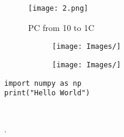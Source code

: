 \begin{figure}[!h]
    \centering
    \texttt{[image: 2.png]}
    \caption{PC from 10 to 1C}
    \label{fig:w2}
\end{figure}

\begin{figure}[!h]
  \begin{subfigure}[b]{0.4\textwidth}
    \texttt{[image: Images/]}
    \caption{}
    \label{fig:asd1}
  \end{subfigure}
  \hfill
  \begin{subfigure}[b]{0.4\textwidth}
    \texttt{[image: Images/]}
    \caption{}
    \label{fig:asd2}
  \end{subfigure}
  \caption{}
\end{figure}



\begin{verbatim}
import numpy as np
print("Hello World")
\end{verbatim}

\inputminted{python}{Code/a.py}

\inputminted[firstline=1, lastline=2]{python}{Code/a.py}



\href{https://example.com}{}.